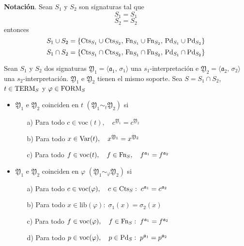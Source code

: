 \textbf{Notación}. Sean $S_1$ y $S_2$ son signaturas tal que 
\[ S_1= \si{S_1} \]
\[ S_2= \si{S_2} \]
entonces 
\[ S_1 \cup S_2 = \{ \mbox{Cts}_{S_1} \cup \mbox{Cts}_{S_2}, \, \mbox{Fn}_{S_1} \cup \mbox{Fn}_{S_2}, \, \mbox{Pd}_{S_1} \cup \mbox{Pd}_{S_2} \} \]
\[ S_1 \cap S_2 = \{ \mbox{Cts}_{S_1} \cap \mbox{Cts}_{S_2}, \, \mbox{Fn}_{S_1} \cap \mbox{Fn}_{S_2}, \, \mbox{Pd}_{S_1} \cap \mbox{Pd}_{S_2} \} \]

\begin{definition}
Sean $S_1$ y $S_2$ dos signaturas $\mathfrak{Y}_1=\langle \mathfrak{a}_1, \, \sigma_1 \rangle$ una $s_1$-interpretación e $\mathfrak{Y}_2=\langle \mathfrak{a}_2, \, \sigma_2 \rangle$ una $s_2$-interpretación. $\mathfrak{Y}_1$ e $\mathfrak{Y}_2$ tienen el mismo soporte. Sea $S=S_1 \cap S_2$, $t \in \mbox{TERM}_{S}$ y $\varphi \in \mbox{FORM}_{S}$
\begin{itemize}
	\item $\mathfrak{Y}_1$ e $\mathfrak{Y}_2$ coinciden en $t$ $(\mathfrak{Y}_1 \sim_{t} \mathfrak{Y}_2)$ si 
	\begin{itemize}
		\item[a)] Para todo $c \in \mbox{voc}(t), \quad c^{\mathfrak{Y}_1}=c^{\mathfrak{Y}_2}$
		\item[b)] Para todo $x \in \mbox{Var}(t), \quad x^{\mathfrak{Y}_1}=x^{\mathfrak{Y}_2}$
		\item[c)] Para todo $f \in \mbox{voc}(t), \quad f \in \mbox{Fn}_{S}, \quad f^{\mathfrak{a}_1}=f^{\mathfrak{a}_2}$
\end{itemize}	 
\item $\mathfrak{Y}_1$ e $\mathfrak{Y}_2$ coinciden en $\varphi$ $(\mathfrak{Y}_1 \sim_{\varphi} \mathfrak{Y}_2)$ si
\begin{itemize}
	\item[a)] Para todo $c \in \mbox{voc}(\varphi), \quad c \in \mbox{Cts}_{S}: \; c^{\mathfrak{a}_1}=c^{\mathfrak{a}_2}$
	\item[b)] Para todo $x \in \mbox{lib}(\varphi): \; \sigma_1(x)=\sigma_2(x)$
	\item[c)] Para todo $f \in \mbox{voc}(\varphi), \quad f \in \mbox{Fn}_{S}: \; f^{\mathfrak{a}_1}=f^{\mathfrak{a}_2}$
	\item[d)] Para todo $p \in \mbox{voc}(\varphi), \quad p \in \mbox{Pd}_{S}: \; p^{\mathfrak{a}_1}=p^{\mathfrak{a}_2}$
\end{itemize}
\end{itemize} 
\end{definition}

